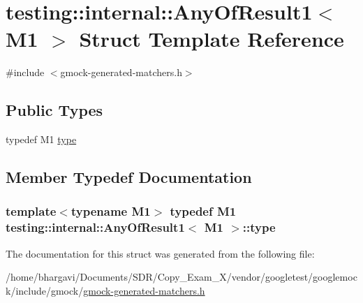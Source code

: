\hypertarget{structtesting_1_1internal_1_1_any_of_result1}{}\section{testing\+:\+:internal\+:\+:Any\+Of\+Result1$<$ M1 $>$ Struct Template Reference}
\label{structtesting_1_1internal_1_1_any_of_result1}


{\ttfamily \#include $<$gmock-\/generated-\/matchers.\+h$>$}

\subsection*{Public Types}
\begin{DoxyCompactItemize}
\item 
typedef M1 \hyperlink{structtesting_1_1internal_1_1_any_of_result1_a4c55b5cf196c93e2a822bc99625f6797}{type}
\end{DoxyCompactItemize}


\subsection{Member Typedef Documentation}
\subsubsection[{\texorpdfstring{type}{type}}]{\setlength{\rightskip}{0pt plus 5cm}template$<$typename M1$>$ typedef M1 {\bf testing\+::internal\+::\+Any\+Of\+Result1}$<$ M1 $>$\+::{\bf type}}\hypertarget{structtesting_1_1internal_1_1_any_of_result1_a4c55b5cf196c93e2a822bc99625f6797}{}\label{structtesting_1_1internal_1_1_any_of_result1_a4c55b5cf196c93e2a822bc99625f6797}


The documentation for this struct was generated from the following file\+:\begin{DoxyCompactItemize}
\item 
/home/bhargavi/\+Documents/\+S\+D\+R/\+Copy\+\_\+\+Exam\+\_\+X/vendor/googletest/googlemock/include/gmock/\hyperlink{gmock-generated-matchers_8h}{gmock-\/generated-\/matchers.\+h}\end{DoxyCompactItemize}
